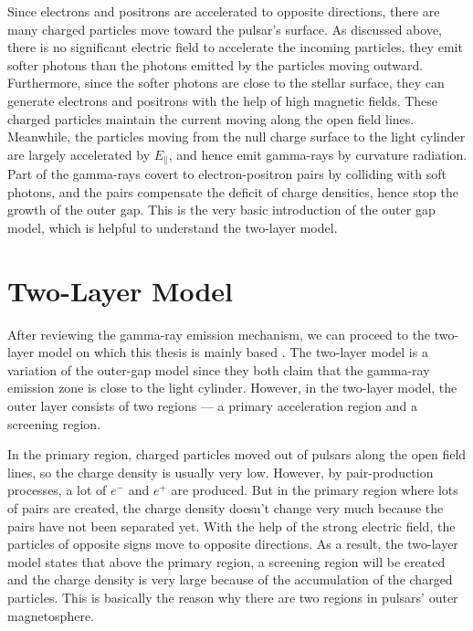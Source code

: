 \documentclass[a4paper, 12pt]{report}
\begin{document}
    Since electrons and positrons are accelerated to opposite directions, there are many 
    charged particles move toward the pulsar's surface. As discussed above, there is no 
    significant electric field to accelerate the incoming particles, they emit softer 
    photons than the photons emitted by the particles moving outward. Furthermore, since the 
    softer photons are close to the stellar surface, they can generate electrons and 
    positrons with the help of high magnetic fields. These charged particles maintain the current 
    moving along the open field lines. Meanwhile, the particles moving from the null charge 
    surface to the light cylinder are largely accelerated by $E_{\parallel}$, and hence 
    emit gamma-rays by curvature radiation. Part of the gamma-rays covert to
    electron-positron pairs by colliding with soft photons, and the pairs compensate 
    the deficit of charge densities, hence stop the growth of the outer gap. This is the 
    very basic introduction of the outer gap model, which is helpful to understand the 
    two-layer model. 
        
  \section{Two-Layer Model}
    After reviewing the gamma-ray emission mechanism, we can proceed to
    the two-layer model on which this thesis is mainly based
    \citep{0004-637X-720-1-178}. The two-layer model is a variation of the outer-gap model 
    since they both claim that the gamma-ray emission zone is close to the light cylinder. 
    However, in the two-layer model, the outer layer consists of two regions --- a primary 
    acceleration region and a screening region. 

    In the primary region, charged particles moved out of pulsars along the open field 
    lines, so the charge density is usually very low. 
    However, by pair-production processes, a lot of $e^{-}$ and $e^{+}$ are produced. 
    But in the primary region where lots of pairs are created, the charge density 
    doesn't change very much because the pairs have not been separated yet. With the help 
    of the strong electric field, the particles of opposite signs move to opposite directions. 
    As a result, the two-layer model states that above the primary region, a screening 
    region will be created and the charge density is very large because of the accumulation 
    of the charged particles. This is basically the reason why there are two regions in 
    pulsars' outer magnetosphere.
\end{document}
